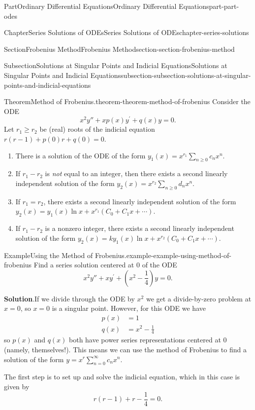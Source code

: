 \documentclass[twoside,10pt,]{book}
\newcommand{\blocktitlefont}{\relax}
\numberwithin{equation}{part}
\begin{document}
\begin{partptx}{Part}{Ordinary Differential Equations}{}{Ordinary Differential Equations}{}{}{part-part-odes}
\begin{chapterptx}{Chapter}{Series Solutions of ODEs}{}{Series Solutions of ODEs}{}{}{chapter-series-solutions}
\begin{sectionptx}{Section}{Frobenius Method}{}{Frobenius Method}{}{}{section-section-frobenius-method}
\begin{subsectionptx}{Subsection}{Solutions at Singular Points and Indicial Equations}{}{Solutions at Singular Points and Indicial Equations}{}{}{subsection-subsection-solutions-at-singular-points-and-indicial-equations}
\begin{theorem}{Theorem}{Method of Frobenius.}{}{theorem-theorem-method-of-frobenius}
%
Consider the ODE%
\begin{equation*}
x^{2}y''+xp(x)y^\prime+q(x)y=0.
\end{equation*}
Let \(r_{1}\geq r_{2}\) be (real) roots of the indicial equation \(r(r-1)+p(0)r+q(0)=0\).%
\begin{enumerate}
\item{}There is a solution of the ODE of the form \(y_{1}(x) = x^{r_{1}}\sum_{n\geq0}^{}c_{n}x^{n}\).%
\item{}If \(r_{1}-r_{2}\) is \emph{not} equal to an integer, then there exists a second linearly independent solution of the form \(y_{2}(x) = x^{r_{2}}\sum_{n\geq0}^{}d_{n}x^{n}\).%
\item{}If \(r_{1} = r_{2}\), there exists a second linearly independent solution of the form \(y_{2}(x) = y_{1}(x)\ln x + x^{r_{1}}(C_{0} + C_{1}x + \cdots )\).%
\item{}If \(r_{1} - r_{2}\) is a nonzero integer, there exists a second linearly independent solution of the form \(y_{2}(x) = ky_{1}(x)\ln x + x^{r_{2}}(C_{0} + C_{1}x + \cdots )\).%
\end{enumerate}
%
\end{theorem}
\begin{example}{Example}{Using the Method of Frobenius.}{example-example-using-method-of-frobenius}%
Find a series solution centered at \(0\) of the ODE%
\begin{equation*}
x^{2}y''+xy^\prime+(x^{2}-\frac{1}{4})y=0.
\end{equation*}
%
\par\smallskip%
\noindent\textbf{\blocktitlefont Solution}.\hypertarget{solution-example-using-method-of-frobenius-c}{}\quad{}If we divide through the ODE by \(x^{2}\) we get a divide-by-zero problem at \(x=0\), so \(x=0\) is a singular point. However, for this ODE we have%
\begin{align*}
p(x) &= 1\\
q(x) &= x^{2}-\frac{1}{4}
\end{align*}
so \(p(x)\) and \(q(x)\) both have power series representations centered at \(0\) (namely, themselves!). This means we can use the method of Frobenius to find a solution of the form \(y = x^r\sum_{n=0}^{\infty}c_n x^n\).%
\par
The first step is to set up and solve the indicial equation, which in this case is given by%
\begin{equation*}
r(r-1)+r-\frac{1}{4} = 0.
\end{equation*}

\end{example}
\end{subsectionptx}
\end{sectionptx}
\end{chapterptx}
\end{partptx}
\end{document}
